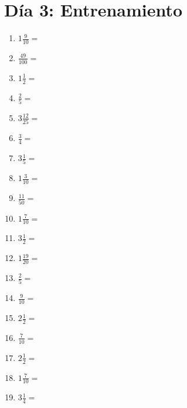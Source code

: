 \documentclass[12pt]{article}
\begin{document}
\section*{Día 3: Entrenamiento}
\begin{enumerate}
\item \large $ 1 \frac{9}{10} = $ \vspace{1.5cm}
\item \large $ \frac{49}{100} = $ \vspace{1.5cm}
\item \large $ 1 \frac{1}{2} = $ \vspace{1.5cm}
\item \large $ \frac{2}{5} = $ \vspace{1.5cm}
\item \large $ 3 \frac{12}{25} = $ \vspace{1.5cm}
\item \large $ \frac{3}{4} = $ \vspace{1.5cm}
\item \large $ 3 \frac{1}{5} = $ \vspace{1.5cm}
\item \large $ 1 \frac{3}{10} = $ \vspace{1.5cm}
\item \large $ \frac{11}{50} = $ \vspace{1.5cm}
\item \large $ 1 \frac{7}{10} = $ \vspace{1.5cm}
\newpage
\item \large $ 3 \frac{1}{2} = $ \vspace{1.5cm}
\item \large $ 1 \frac{19}{20} = $ \vspace{1.5cm}
\item \large $ \frac{2}{5} = $ \vspace{1.5cm}
\item \large $ \frac{9}{10} = $ \vspace{1.5cm}
\item \large $ 2 \frac{1}{2} = $ \vspace{1.5cm}
\item \large $ \frac{7}{10} = $ \vspace{1.5cm}
\item \large $ 2 \frac{1}{2} = $ \vspace{1.5cm}
\item \large $ 1 \frac{7}{10} = $ \vspace{1.5cm}
\item \large $ 3 \frac{1}{4} = $ \vspace{1.5cm}

\end{enumerate}
\end{document}
